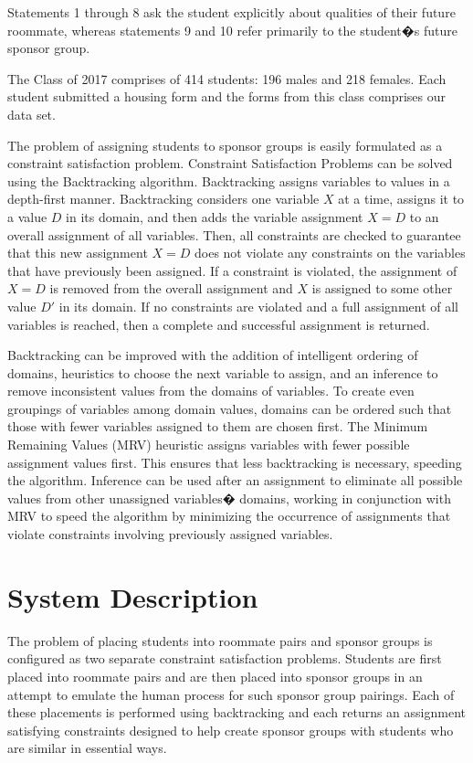 \documentclass[letterpaper]{article}
\begin{document}
Statements 1 through 8 ask the student explicitly about qualities of their future roommate, whereas statements 9 and 10 refer primarily to the student�s future sponsor group.

The Class of 2017 comprises of 414 students: 196 males and 218 females. Each student submitted a housing form and the forms from this class comprises our data set.

The problem of assigning students to sponsor groups is easily formulated as a constraint satisfaction problem. Constraint Satisfaction Problems can be solved using the Backtracking algorithm. Backtracking assigns variables to values in a depth-first manner. Backtracking considers one variable $X$ at a time, assigns it to a value $D$ in its domain, and then adds the variable assignment $X = D$ to an overall assignment of all variables. Then, all constraints are checked to guarantee that this new assignment $X = D$ does not violate any constraints on the variables that have previously been assigned. If a constraint is violated, the assignment of $X = D$ is removed from the overall assignment and $X$ is assigned to some other value $D'$ in its domain. If no constraints are violated and a full assignment of all variables is reached, then a complete and successful assignment is returned.

Backtracking can be improved with the addition of intelligent ordering of domains, heuristics to choose the next variable to assign, and an inference to remove inconsistent values from the domains of variables. To create even groupings of variables among domain values, domains can be ordered such that those with fewer variables assigned to them are chosen first. The Minimum Remaining Values (MRV) heuristic assigns variables with fewer possible assignment values first. This ensures that less backtracking is necessary, speeding the algorithm. Inference can be used after an assignment to eliminate all possible values from other unassigned variables� domains, working in conjunction with MRV to speed the algorithm by minimizing the occurrence of assignments that violate constraints involving previously assigned variables.

\section{System Description}
The problem of placing students into roommate pairs and sponsor groups is configured as two separate constraint satisfaction problems. Students are first placed into roommate pairs and are then placed into sponsor groups in an attempt to emulate the human process for such sponsor group pairings. Each of these placements is performed using backtracking and each returns an assignment satisfying constraints designed to help create sponsor groups with students who are similar in essential ways.
\end{document}
